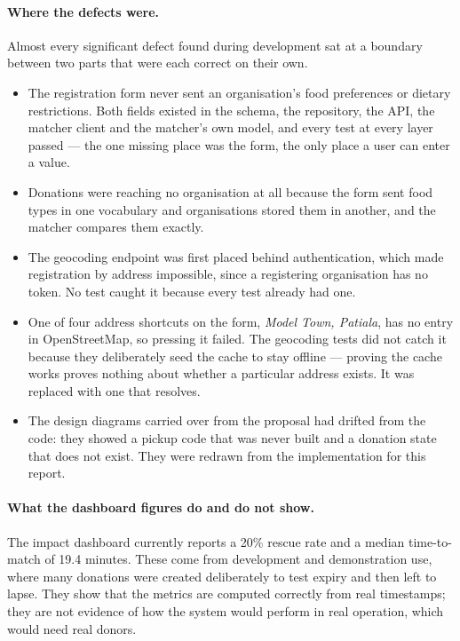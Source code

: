 \documentclass[11pt,a4paper]{report}
\begin{document}
\paragraph{Where the defects were.} Almost every significant defect found during
development sat at a boundary between two parts that were each correct on their
own.
\begin{itemize}
  \item The registration form never sent an organisation's food preferences or
    dietary restrictions. Both fields existed in the schema, the repository, the
    API, the matcher client and the matcher's own model, and every test at every
    layer passed --- the one missing place was the form, the only place a user
    can enter a value.
  \item Donations were reaching no organisation at all because the form sent
    food types in one vocabulary and organisations stored them in another, and
    the matcher compares them exactly.
  \item The geocoding endpoint was first placed behind authentication, which made
    registration by address impossible, since a registering organisation has no
    token. No test caught it because every test already had one.
  \item One of four address shortcuts on the form, \emph{Model Town, Patiala},
    has no entry in OpenStreetMap, so pressing it failed. The geocoding tests did
    not catch it because they deliberately seed the cache to stay offline ---
    proving the cache works proves nothing about whether a particular address
    exists. It was replaced with one that resolves.
  \item The design diagrams carried over from the proposal had drifted from the
    code: they showed a pickup code that was never built and a donation state
    that does not exist. They were redrawn from the implementation for this
    report.
\end{itemize}

\paragraph{What the dashboard figures do and do not show.} The impact dashboard
currently reports a 20\% rescue rate and a median time-to-match of 19.4 minutes.
These come from development and demonstration use, where many donations were
created deliberately to test expiry and then left to lapse. They show that the
metrics are computed correctly from real timestamps; they are not evidence of how
the system would perform in real operation, which would need real donors.
\end{document}
